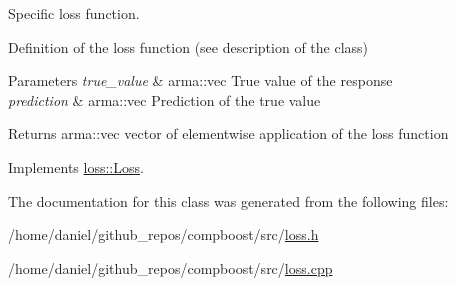 Specific loss function. 

Definition of the loss function (see description of the class)


\begin{DoxyParams}{Parameters}
{\em true\+\_\+value} & {\ttfamily arma\+::vec} True value of the response \\
\hline
{\em prediction} & {\ttfamily arma\+::vec} Prediction of the true value\\
\hline
\end{DoxyParams}
\begin{DoxyReturn}{Returns}
{\ttfamily arma\+::vec} vector of elementwise application of the loss function 
\end{DoxyReturn}


Implements \hyperlink{classloss_1_1_loss_ae9f94dd9b8311397583ba3a9cb485e94}{loss\+::\+Loss}.



The documentation for this class was generated from the following files\+:\begin{DoxyCompactItemize}
\item 
/home/daniel/github\+\_\+repos/compboost/src/\hyperlink{loss_8h}{loss.\+h}\item 
/home/daniel/github\+\_\+repos/compboost/src/\hyperlink{loss_8cpp}{loss.\+cpp}\end{DoxyCompactItemize}
